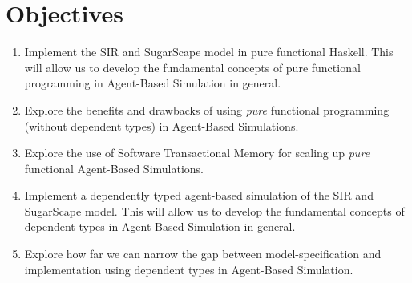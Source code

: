 \section{Objectives}
\begin{enumerate}
	\item Implement the SIR and SugarScape model in pure functional Haskell. This will allow us to develop the fundamental concepts of pure functional programming in Agent-Based Simulation in general.

	\item Explore the benefits and drawbacks of using \textit{pure} functional programming (without dependent types) in Agent-Based Simulations.

	\item Explore the use of Software Transactional Memory for scaling up \textit{pure} functional Agent-Based Simulations.

	\item Implement a dependently typed agent-based simulation of the SIR and SugarScape model. This will allow us to develop the fundamental concepts of dependent types in Agent-Based Simulation in general.

	\item Explore how far we can narrow the gap between model-specification and implementation using dependent types in Agent-Based Simulation.
\end{enumerate}